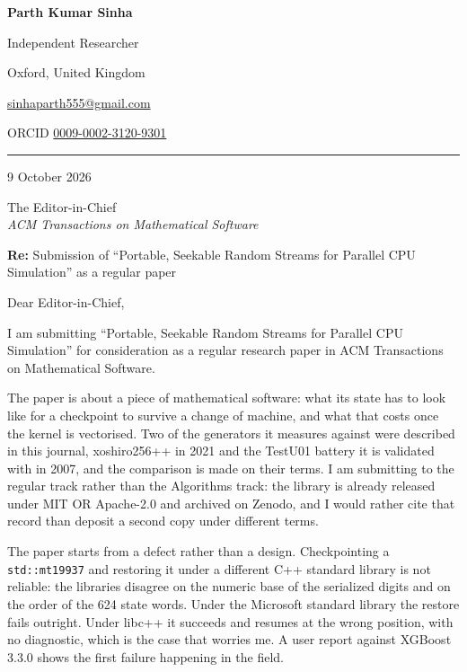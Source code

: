 \documentclass[11pt,a4paper]{article}
\newcommand{\sender}[1]{{\small\sffamily #1\par}}
\begin{document}
{\sffamily\bfseries\large Parth Kumar Sinha}\par
\vspace{2pt}
\sender{Independent Researcher}
\sender{Oxford, United Kingdom}
\sender{\href{mailto:sinhaparth555@gmail.com}{sinhaparth555@gmail.com}}
\sender{ORCID \href{https://orcid.org/0009-0002-3120-9301}{0009-0002-3120-9301}}

\vspace{18pt}
\hrule
\vspace{18pt}

9 October 2026

\vspace{10pt}

The Editor-in-Chief\\
\textit{ACM Transactions on Mathematical Software}

\vspace{14pt}

\textbf{Re:} Submission of ``Portable, Seekable Random Streams for Parallel CPU
Simulation'' as a regular paper

\vspace{10pt}

Dear Editor-in-Chief,

I am submitting ``Portable, Seekable Random Streams for Parallel CPU
Simulation'' for consideration as a regular research paper in ACM Transactions
on Mathematical Software.

The paper is about a piece of mathematical software: what its state has to
look like for a checkpoint to survive a change of machine, and what that costs
once the kernel is vectorised. Two of the generators it measures against were
described in this journal, xoshiro256++ in 2021 and the TestU01 battery it is
validated with in 2007, and the comparison is made on their terms. I am
submitting to the regular track rather than the Algorithms track: the library is
already released under MIT OR Apache-2.0 and archived on Zenodo, and I would
rather cite that record than deposit a second copy under different terms.

The paper starts from a defect rather than a design. Checkpointing a
\texttt{std::mt19937} and restoring it under a different C++ standard library is
not reliable: the libraries disagree on the numeric base of the serialized
digits and on the order of the 624 state words. Under the Microsoft standard
library the restore fails outright. Under libc++ it succeeds and resumes at the
wrong position, with no diagnostic, which is the case that worries me. A user
report against XGBoost 3.3.0 shows the first failure happening in the field.
\end{document}
